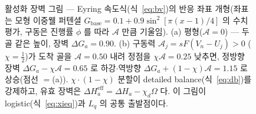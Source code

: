 \documentclass[11pt,a4paper]{article}
\newcommand{\eff}{\mathrm{eff}}
\begin{document}
\begin{figure}[t]
\caption{활성화 장벽 그림 --- Eyring 속도식(식~\eqref{eq:bv})의 반응 좌표 개형(좌표는 모형 이중웰 퍼텐셜
$G_\mathrm{base}{=}0.1{+}0.9\sin^2[\pi(x{-}1)/4]$ 의 수치 평가, 구동은 진행률 $\phi$ 를 따라 $\mathcal A$ 만큼 기울임).
(a) 평형($\mathcal A{=}0$) --- 두 골 같은 높이, 장벽 $\Delta G_a{=}0.90$. (b) 구동력 $\mathcal A_j{=}sF(V_n{-}U_j){>}0$
($\chi{=}\tfrac12$)가 도착 골을 $\mathcal A{=}0.50$ 내려 정점을 $\chi\mathcal A{=}0.25$ 낮추면, 정방향 장벽
$\Delta G_a{-}\chi\mathcal A{=}0.65$ 로 하강$\cdot$역방향 $\Delta G_a{+}(1{-}\chi)\mathcal A{=}1.15$ 로 상승(점선 $=$(a)).
$\chi\!\cdot\!(1{-}\chi)$ 분할이 detailed balance(식~\eqref{eq:db})를 강제하고, 유효 장벽은 $\Delta H_a^\eff{=}\Delta H_a{-}\chi_d\Omega$
다. 이 그림이 logistic(식~\eqref{eq:xieq})과 $L_q$ 의 공통 출발점이다.}
\label{fig:barrier}
\end{figure}
\end{document}
